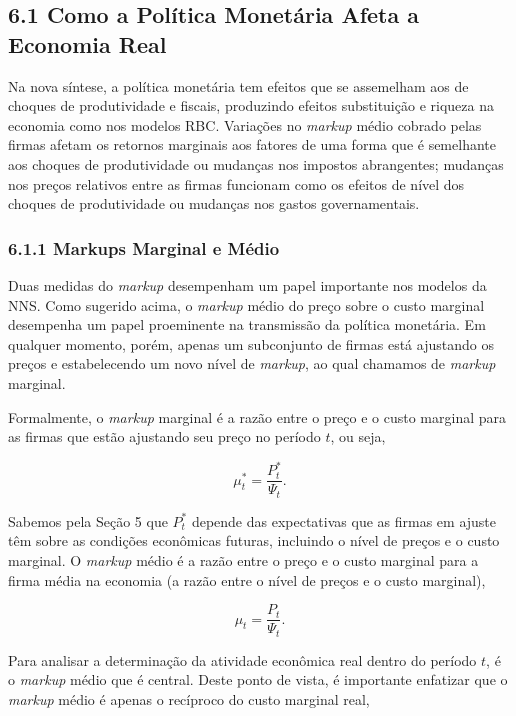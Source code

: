 \documentclass[12pt]{article}
\begin{document}
\subsection{6.1 Como a Política Monetária Afeta a Economia Real}

Na nova síntese, a política monetária tem efeitos que se assemelham aos de choques de produtividade e fiscais, produzindo efeitos substituição e riqueza na economia como nos modelos RBC. Variações no \textit{markup} médio cobrado pelas firmas afetam os retornos marginais aos fatores de uma forma que é semelhante aos choques de produtividade ou mudanças nos impostos abrangentes; mudanças nos preços relativos entre as firmas funcionam como os efeitos de nível dos choques de produtividade ou mudanças nos gastos governamentais.

\subsubsection{6.1.1 Markups Marginal e Médio} Duas medidas do \textit{markup} desempenham um papel importante nos modelos da NNS. Como sugerido acima, o \textit{markup} médio do preço sobre o custo marginal desempenha um papel proeminente na transmissão da política monetária. Em qualquer momento, porém, apenas um subconjunto de firmas está ajustando os preços e estabelecendo um novo nível de \textit{markup}, ao qual chamamos de \textit{markup} marginal.

Formalmente, o \textit{markup} marginal é a razão entre o preço e o custo marginal para as firmas que estão ajustando seu preço no período $t$, ou seja,

\begin{equation}
\mu_t^* = \frac{P_t^*}{\Psi_t}. \tag{6.1}
\end{equation}

Sabemos pela Seção 5 que $P_t^*$ depende das expectativas que as firmas em ajuste têm sobre as condições econômicas futuras, incluindo o nível de preços e o custo marginal. O \textit{markup} médio é a razão entre o preço e o custo marginal para a firma média na economia (a razão entre o nível de preços e o custo marginal),

\begin{equation}
\mu_t = \frac{P_t}{\Psi_t}. \tag{6.2}
\end{equation}

Para analisar a determinação da atividade econômica real dentro do período $t$, é o \textit{markup} médio que é central. Deste ponto de vista, é importante enfatizar que o \textit{markup} médio é apenas o recíproco do custo marginal real,
\end{document}
